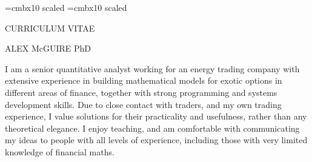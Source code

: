 \font\titlesize=cmbx10 scaled
\font\namesize=cmbx10 scaled
\vsize=10in
\hsize=8in
\voffset -0.4in
\hoffset -0.9in
\vskip 1cm
\centerline{\titlesize CURRICULUM VITAE}
\vskip 0.4in
\centerline{\namesize ALEX McGUIRE PhD}
\vskip 0.2in
\def\jobskip{\noalign{\bigskip}}
\def\posskip{\noalign{\medskip}}
\midinsert
\narrower\narrower\narrower
\noindent I am a senior quantitative analyst working for an energy trading company with extensive experience in building mathematical models for exotic options in 
different areas of finance, together with strong programming and systems development skills. Due to close contact with traders, and my own trading experience, I value
solutions for their practicality and usefulness, rather than any theoretical elegance. I enjoy teaching, and am comfortable with communicating my ideas to people with all
levels of experience, including those with very limited knowledge of financial maths.
\endinsert


